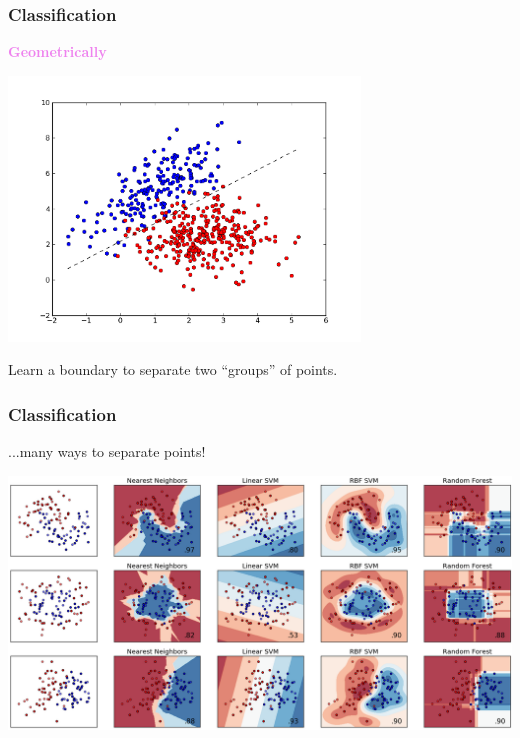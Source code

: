 \documentclass[9pt]{beamer}
\begin{document}
\begin{frame}[t]
\frametitle{Classification}

\textcolor{violet}{{\bf Geometrically}}
\begin{center}
\includegraphics[width=0.7\textwidth]{./lda_binary.png}  
\end{center}
Learn a \alert{boundary to separate two ``groups''} of points.
\end{frame}


\begin{frame}[t]
\frametitle{Classification}

...many ways to separate points!

\begin{center}
\includegraphics[width=1\textwidth]{./classifier_comparison.png}
\end{center}
\end{frame}
\end{document}
